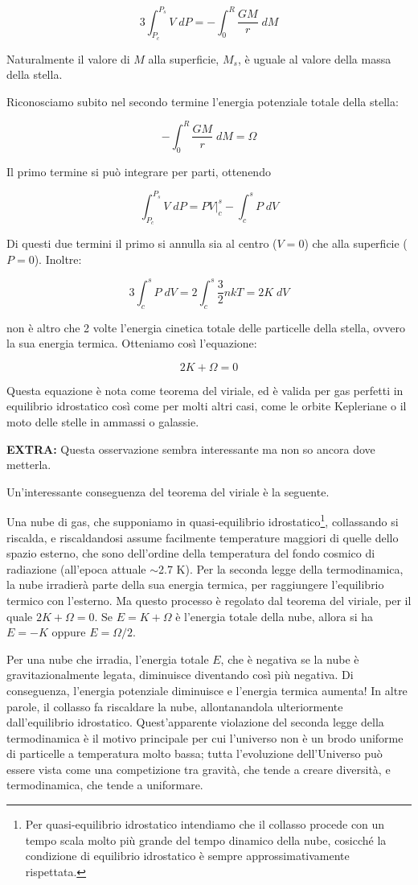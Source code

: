 $$3 \int_{P_c}^{P_s} V \; dP=-\int_{0}^{R} \frac{GM}{r} \; dM$$

Naturalmente il valore di $M$ alla superficie, $M_s$, è uguale al valore della massa della stella.

Riconosciamo subito nel secondo termine l'energia potenziale totale della stella:

$$-\int_{0}^{R} \frac{GM}{r} \; dM=\Omega$$

Il primo termine si può integrare per parti, ottenendo

$$\int_{P_c}^{P_s} V \; dP
=PV\big|_{c}^{s} - \int_{c}^{s} P \; dV$$

Di questi due termini il primo si annulla sia al centro ($V=0$) che alla superficie ($P=0$). Inoltre:

$$3 \int_{c}^{s} P \; dV=2 \int_{c}^{s} \frac{3}{2} nkT=2K \; dV$$

non è altro che 2 volte l'energia cinetica totale delle particelle della stella, ovvero la sua energia
termica. Otteniamo così l'equazione:

$$2K + \Omega=0$$

Questa equazione è nota come teorema del viriale, ed è valida per gas perfetti in equilibrio
idrostatico così come per molti altri casi, come le orbite Kepleriane o il moto delle stelle in
ammassi o galassie.

\textbf{EXTRA:} Questa osservazione sembra interessante ma non so ancora dove metterla.

Un'interessante conseguenza del teorema del viriale è la seguente.

Una nube di gas, che supponiamo in quasi-equilibrio idrostatico\footnote{Per quasi-equilibrio idrostatico intendiamo che il collasso procede con un tempo scala molto più grande del tempo dinamico della nube, cosicché la condizione di equilibrio idrostatico è sempre approssimativamente rispettata.}, collassando si riscalda, e riscaldandosi assume facilmente temperature maggiori di quelle dello spazio esterno, che sono dell'ordine della temperatura del fondo cosmico di radiazione (all'epoca attuale $\sim$2.7 K). Per la seconda legge della termodinamica, la nube irradierà parte della sua energia termica, per raggiungere l'equilibrio termico con l'esterno. Ma questo processo è regolato dal teorema del viriale, per il quale
$2K + \Omega = 0$. Se $E = K + \Omega$ è l'energia totale della nube, allora si ha $E = -K$ oppure $E = \Omega/2$.

Per una nube che irradia, l'energia totale $E$, che è negativa se la nube è gravitazionalmente legata, diminuisce diventando così più negativa. Di conseguenza, l'energia potenziale diminuisce e l'energia termica aumenta! In altre parole, il collasso fa riscaldare la nube, allontanandola ulteriormente dall'equilibrio idrostatico. Quest'apparente violazione del seconda legge della termodinamica è il motivo principale per cui l'universo non è un brodo uniforme di particelle a temperatura molto bassa; tutta l'evoluzione dell'Universo può essere vista come una competizione tra gravità, che tende a creare diversità, e termodinamica, che tende a uniformare.


